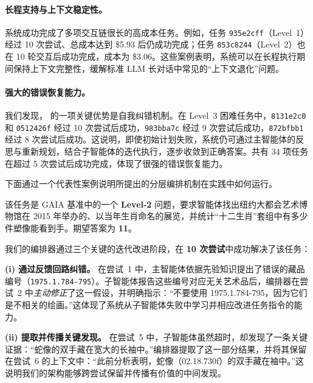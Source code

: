 \paragraph{长程支持与上下文稳定性。}
系统成功完成了多项交互链很长的高成本任务。例如，任务 \texttt{935e2cff}（Level~1）经过 10 次尝试、总成本达到 \$5.93 后仍成功完成；任务 \texttt{853c8244}（Level~2）也在 10 轮交互后成功完成，成本为 \$3.06。这些案例表明，系统可以在长程执行期间保持上下文完整性，缓解标准 LLM 长对话中常见的“上下文退化”问题。

\paragraph{强大的错误恢复能力。}
我们发现，\our{} 的一项关键优势是自我纠错机制。在 Level~3 困难任务中，\texttt{8131e2c0} 和 \texttt{0512426f} 经过 10 次尝试后成功，\texttt{983bba7c} 经过 9 次尝试后成功，\texttt{872bfbb1} 经过 8 次尝试后成功。这说明，即使初始计划失败，系统仍可通过主智能体的反思与重新规划，结合子智能体的迭代执行，逐步收敛到正确答案。共有 34 项任务在超过 5 次尝试后成功完成，体现了很强的错误恢复能力。

%


下面通过一个代表性案例说明所提出的分层编排机制在实践中如何运行。

该任务是 GAIA 基准中的一个 \textbf{Level-2} 问题，要求智能体找出纽约大都会艺术博物馆在 2015 年举办的、以当年生肖命名的展览，并统计“十二生肖”套组中有多少件塑像能看到手。期望答案为 \textbf{11}。

我们的编排器通过三个关键的迭代改进阶段，在 \textbf{10 次尝试}中成功解决了该任务：

\textbf{(i) 通过反馈回路纠错。}
在尝试~1 中，主智能体依据先验知识提出了错误的藏品编号（\texttt{1975.1.784-795}）。子智能体报告这些编号对应无关艺术品后，编排器在尝试~2 中\emph{主动修正}了这一假设，并明确指示：“不要使用 1975.1.784-795，因为它们是不相关的绘画。”这体现了系统从子智能体失败中学习并相应改进任务指令的能力。

\textbf{(ii) 提取并传播关键发现。}
在尝试~5 中，子智能体虽然超时，却发现了一条关键证据：“蛇像的双手藏在宽大的长袖中。”编排器提取了这一部分结果，并将其保留在尝试~6 的上下文中：“此前分析表明，蛇像（02.18.730f）的双手藏在袖中。”这说明我们的架构能够跨尝试保留并传播有价值的中间发现。

